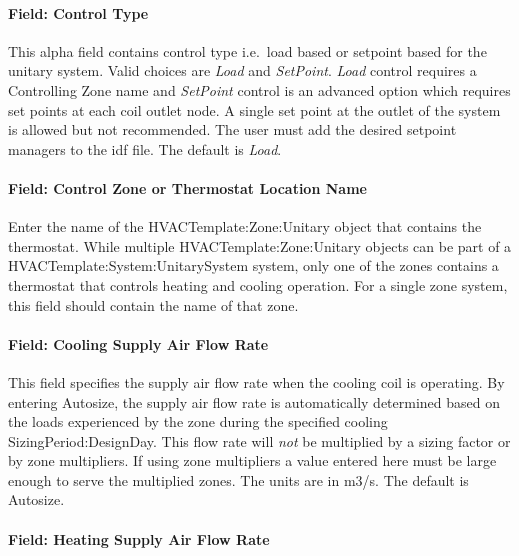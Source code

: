 \paragraph{Field: Control Type}\label{field-control-type-002}

This alpha field contains control type i.e.~load based or setpoint based for the unitary system. Valid choices are \emph{Load} and \emph{SetPoint}. \emph{Load} control requires a Controlling Zone name and \emph{SetPoint} control is an advanced option which requires set points at each coil outlet node. A single set point at the outlet of the system is allowed but not recommended. The user must add the desired setpoint managers to the idf file. The default is \emph{Load}.

\paragraph{Field: Control Zone or Thermostat Location Name}\label{field-control-zone-or-thermostat-location-name-2}

Enter the name of the HVACTemplate:Zone:Unitary object that contains the thermostat. While multiple HVACTemplate:Zone:Unitary objects can be part of a HVACTemplate:System:UnitarySystem system, only one of the zones contains a thermostat that controls heating and cooling operation. For a single zone system, this field should contain the name of that zone.

\paragraph{Field: Cooling Supply Air Flow Rate}\label{field-cooling-supply-air-flow-rate-5}

This field specifies the supply air flow rate when the cooling coil is operating. By entering Autosize, the supply air flow rate is automatically determined based on the loads experienced by the zone during the specified cooling SizingPeriod:DesignDay. This flow rate will \emph{not} be multiplied by a sizing factor or by zone multipliers. If using zone multipliers a value entered here must be large enough to serve the multiplied zones. The units are in m3/s. The default is Autosize.

\paragraph{Field: Heating Supply Air Flow Rate}\label{field-heating-supply-air-flow-rate-5}

